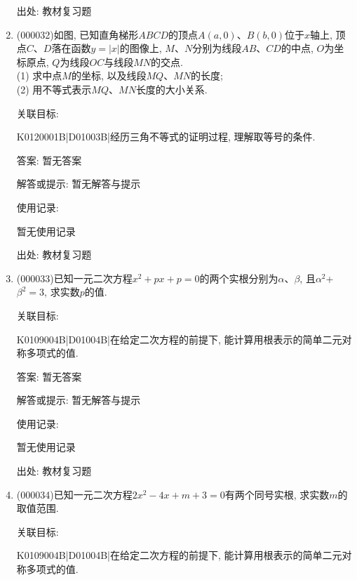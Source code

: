 \documentclass[10pt,a4paper]{article}
\begin{document}
\begin{enumerate}[1.]
出处: 教材复习题
\item { (000032)}如图, 已知直角梯形$ABCD$的顶点$A(a, 0)$、$B(b, 0)$位于$x$轴上, 顶点$C$、$D$落在函数$y=|x|$的图像上, $M$、$N$分别为线段$AB$、$CD$的中点, $O$为坐标原点, $Q$为线段$OC$与线段$MN$的交点.\\
(1) 求中点$M$的坐标, 以及线段$MQ$、$MN$的长度;\\
(2) 用不等式表示$MQ$、$MN$长度的大小关系.
\begin{center}
\end{center}


关联目标:

K0120001B|D01003B|经历三角不等式的证明过程, 理解取等号的条件.

答案: 暂无答案

解答或提示: 暂无解答与提示

使用记录:

暂无使用记录


出处: 教材复习题
\item { (000033)}已知一元二次方程$x^2+px+p=0$的两个实根分别为$\alpha$、$\beta$, 且$\alpha^2$+$\beta^2=3$, 求实数$p$的值.


关联目标:

K0109004B|D01004B|在给定二次方程的前提下, 能计算用根表示的简单二元对称多项式的值.

答案: 暂无答案

解答或提示: 暂无解答与提示

使用记录:

暂无使用记录


出处: 教材复习题
\item { (000034)}已知一元二次方程$2x^2-4x+m+3=0$有两个同号实根, 求实数$m$的取值范围.


关联目标:

K0109004B|D01004B|在给定二次方程的前提下, 能计算用根表示的简单二元对称多项式的值.


\end{enumerate}
\end{document}
